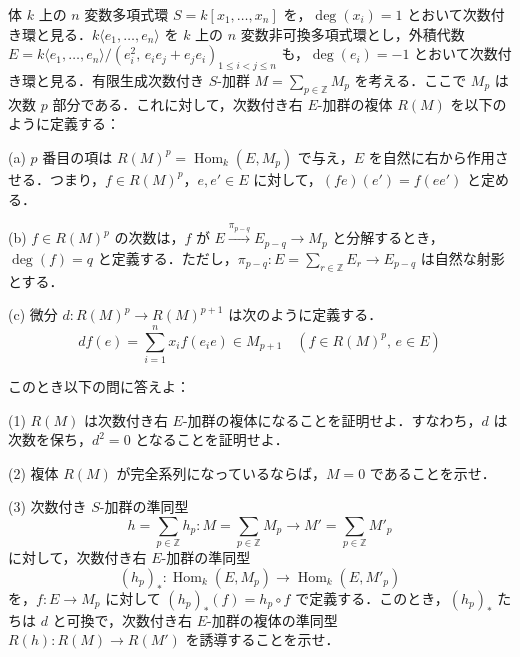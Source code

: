 \documentclass[12pt]{jlreq}
\begin{document}
体 \(k\) 上の \(n\) 変数多項式環 \(S = k[x_1, \dots, x_n]\) を，\(\deg(x_i) = 1\) とおいて次数付き環と見る．\(k\langle e_1, \dots, e_n\rangle\) を \(k\) 上の \(n\) 変数非可換多項式環とし，外積代数 \(E = k\langle e_1, \dots, e_n\rangle / (e_i^2,\, e_i e_j + e_j e_i)_{1 \le i < j \le n}\) も，\(\deg(e_i) = -1\) とおいて次数付き環と見る．有限生成次数付き \(S\)-加群 \(M = \sum_{p \in \mathbb{Z}} M_p\) を考える．ここで \(M_p\) は次数 \(p\) 部分である．これに対して，次数付き右 \(E\)-加群の複体 \(R(M)\) を以下のように定義する：

(a) \(p\) 番目の項は \(R(M)^p = \operatorname{Hom}_k(E, M_p)\) で与え，\(E\) を自然に右から作用させる．つまり，\(f \in R(M)^p\)，\(e, e' \in E\) に対して，\((fe)(e') = f(ee')\) と定める．

(b) \(f \in R(M)^p\) の次数は，\(f\) が \(E \xrightarrow{\pi_{p-q}} E_{p-q} \to M_p\) と分解するとき，\(\deg(f) = q\) と定義する．ただし，\(\pi_{p-q} : E = \sum_{r \in \mathbb{Z}} E_r \to E_{p-q}\) は自然な射影とする．

(c) 微分 \(d : R(M)^p \to R(M)^{p+1}\) は次のように定義する．
\[
  df(e) = \sum_{i=1}^n x_i f(e_i e) \in M_{p+1} \quad (f \in R(M)^p,\, e \in E)
\]

このとき以下の問に答えよ：

(1) \(R(M)\) は次数付き右 \(E\)-加群の複体になることを証明せよ．すなわち，\(d\) は次数を保ち，\(d^2 = 0\) となることを証明せよ．

(2) 複体 \(R(M)\) が完全系列になっているならば，\(M = 0\) であることを示せ．

(3) 次数付き \(S\)-加群の準同型
\[
  h = \sum_{p \in \mathbb{Z}} h_p : M = \sum_{p \in \mathbb{Z}} M_p \to M' = \sum_{p \in \mathbb{Z}} M'_p
\]
に対して，次数付き右 \(E\)-加群の準同型
\[
  (h_p)_* : \operatorname{Hom}_k(E, M_p) \to \operatorname{Hom}_k(E, M'_p)
\]
を，\(f : E \to M_p\) に対して \((h_p)_*(f) = h_p \circ f\) で定義する．このとき，\((h_p)_*\) たちは \(d\) と可換で，次数付き右 \(E\)-加群の複体の準同型 \(R(h) : R(M) \to R(M')\) を誘導することを示せ．
\end{document}
